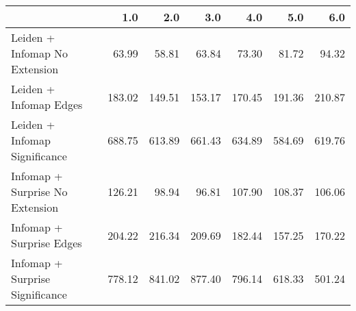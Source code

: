 \begin{tabular}{lrrrrrr}
\toprule
{} &    1.0 &    2.0 &    3.0 &    4.0 &    5.0 &    6.0 \\
\midrule
Leiden + Infomap No Extension   &  63.99 &  58.81 &  63.84 &  73.30 &  81.72 &  94.32 \\
Leiden + Infomap Edges          & 183.02 & 149.51 & 153.17 & 170.45 & 191.36 & 210.87 \\
Leiden + Infomap Significance   & 688.75 & 613.89 & 661.43 & 634.89 & 584.69 & 619.76 \\
Infomap + Surprise No Extension & 126.21 &  98.94 &  96.81 & 107.90 & 108.37 & 106.06 \\
Infomap + Surprise Edges        & 204.22 & 216.34 & 209.69 & 182.44 & 157.25 & 170.22 \\
Infomap + Surprise Significance & 778.12 & 841.02 & 877.40 & 796.14 & 618.33 & 501.24 \\
\bottomrule
\end{tabular}
